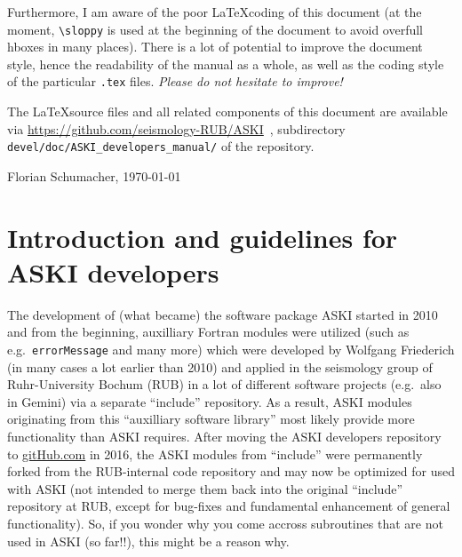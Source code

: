\documentclass[12pt,a4paper]{article}
\newcommand{\lcode}[1]{\nolinkurl{#1}}
\newcommand{\ASKI}{ {\ttfamily ASKI} }
\begin{document}
Furthermore, I am aware of the poor \LaTeX coding of this document (at the moment, \verb+\sloppy+ is used
at the beginning of the document to avoid overfull hboxes in many places). There is a lot of potential
to improve the document 
style, hence the readability of the manual as a whole, as well as the coding style of the 
particular \lcode{.tex} files. \emph{Please do not hesitate to improve!}

The \LaTeX source files and all related components of this document are available via
\url{https://github.com/seismology-RUB/ASKI}~, subdirectory \lcode{devel/doc/ASKI_developers_manual/}
of the repository.
\begin{flushright}
Florian Schumacher, \mydate \today
\end{flushright}

%
\newpage
\tableofcontents
\newpage

\section{Introduction and guidelines for \ASKI{} developers} \label{sec:intro}
%
The development of (what became) the software package \ASKI{} started in 2010 and from the beginning, auxilliary
Fortran modules were utilized (such as e.g.\ \lcode{errorMessage} and many more) which were developed by
Wolfgang Friederich (in many cases a lot earlier than 2010) and applied in the seismology group of Ruhr-University
Bochum (RUB) in a lot of different software projects (e.g.\ also in Gemini) via a separate ``include'' repository. 
As a result, \ASKI{} modules 
originating from this ``auxilliary software library'' most likely provide more functionality than \ASKI{} 
requires. After moving the \ASKI{} developers repository to \url{gitHub.com} in 2016, the \ASKI{} modules from 
``include'' were permanently forked from the RUB-internal code repository and may now be optimized
for used with \ASKI{} (not intended to merge them back into the original ``include'' repository at RUB, except
for bug-fixes and fundamental enhancement of general functionality). So, if you wonder why you come accross 
subroutines that are not used in \ASKI{} (so far!!), this might be a reason why.
\end{document}
